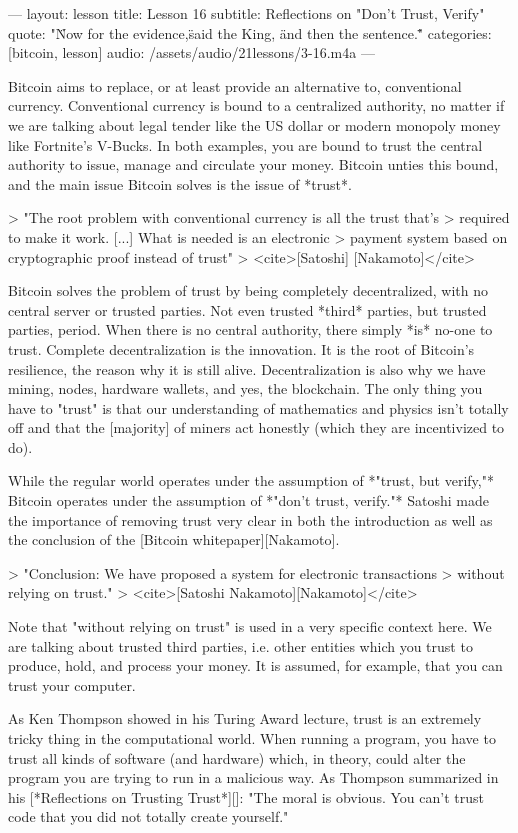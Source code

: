 ---
layout: lesson
title: Lesson 16
subtitle: Reflections on "Don't Trust, Verify"
quote: "\"Now for the evidence,\" said the King, \"and then the sentence.\""
categories: [bitcoin, lesson]
audio: /assets/audio/21lessons/3-16.m4a 
---

Bitcoin aims to replace, or at least provide an alternative to,
conventional currency. Conventional currency is bound to a centralized
authority, no matter if we are talking about legal tender like the US
dollar or modern monopoly money like Fortnite's V-Bucks. In both
examples, you are bound to trust the central authority to issue, manage
and circulate your money. Bitcoin unties this bound, and the main issue
Bitcoin solves is the issue of *trust*.

> "The root problem with conventional currency is all the trust that's
> required to make it work. [...] What is needed is an electronic
> payment system based on cryptographic proof instead of trust"
> <cite>[Satoshi] [Nakamoto]</cite>

Bitcoin solves the problem of trust by being completely decentralized,
with no central server or trusted parties. Not even trusted *third*
parties, but trusted parties, period. When there is no central
authority, there simply *is* no-one to trust. Complete decentralization
is the innovation. It is the root of Bitcoin's resilience, the reason
why it is still alive. Decentralization is also why we have mining,
nodes, hardware wallets, and yes, the blockchain. The only thing you
have to "trust" is that our understanding of mathematics and physics
isn't totally off and that the [majority] of miners act honestly (which
they are incentivized to do).

While the regular world operates under the assumption of *"trust, but
verify,"* Bitcoin operates under the assumption of *"don't trust,
verify."* Satoshi made the importance of removing trust very clear in
both the introduction as well as the conclusion of the [Bitcoin
whitepaper][Nakamoto].

> "Conclusion: We have proposed a system for electronic transactions
> without relying on trust."
> <cite>[Satoshi Nakamoto][Nakamoto]</cite>

Note that "without relying on trust" is used in a very specific context
here. We are talking about trusted third parties, i.e. other entities
which you trust to produce, hold, and process your money. It is assumed,
for example, that you can trust your computer.

As Ken Thompson showed in his Turing Award lecture, trust is an
extremely tricky thing in the computational world. When running a
program, you have to trust all kinds of software (and hardware) which,
in theory, could alter the program you are trying to run in a malicious
way. As Thompson summarized in his [*Reflections on Trusting Trust*][]:
"The moral is obvious. You can't trust code that you did not totally
create yourself."

